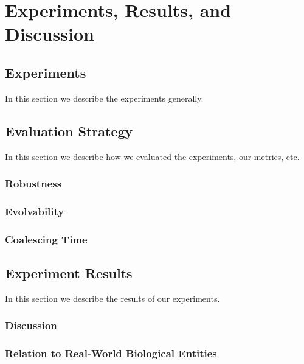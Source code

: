 \chapter{Experiments, Results, and Discussion}\label{ch:results_discussion}


\section{Experiments}
In this section we describe the experiments generally. 
\section{Evaluation Strategy}\label{evalmetrics}
In this section we describe how we evaluated the experiments, our metrics, etc.

\subsection{Robustness}
\subsection{Evolvability}
\subsection{Coalescing Time}

\section{Experiment Results}\label{results}
In this section we describe the results of our experiments. 


\subsection{Discussion}\label{discussion}

\subsection{Relation to Real-World Biological Entities}
